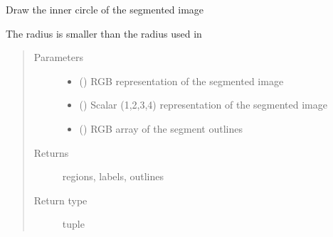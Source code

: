 \documentclass[letterpaper,10pt,english]{sphinxmanual}
\begin{document}
\begin{fulllineitems}
\label{\detokenize{createregions:createregions.inner_circle}}
Draw the inner circle of the segmented image

The radius is smaller than the radius used in {\hyperref[\detokenize{createregions:createregions.large_circle}]{}}
\begin{quote}\begin{description}
\item[{Parameters}] \leavevmode\begin{itemize}
\item {} 
 () \textendash{} RGB representation of the segmented image

\item {} 
 () \textendash{} Scalar (1,2,3,4) representation of the segmented image

\item {} 
 () \textendash{} RGB array of the segment outlines

\end{itemize}

\item[{Returns}] \leavevmode
regions, labels, outlines

\item[{Return type}] \leavevmode
tuple

\end{description}\end{quote}

\end{fulllineitems}

\end{document}
